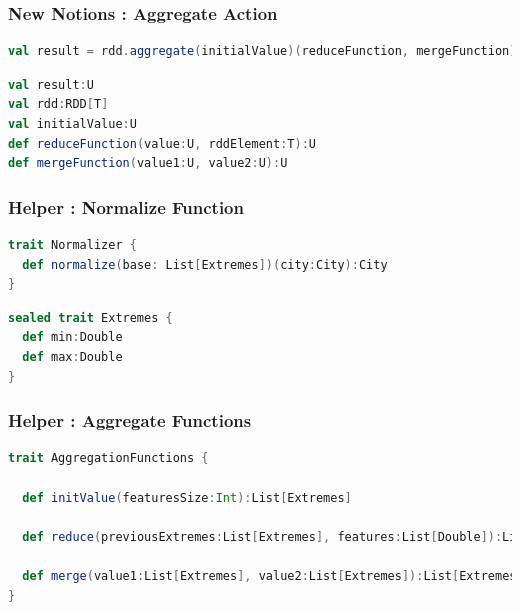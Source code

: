 \documentclass[slidetop,9pt,utf8]{beamer}
\begin{document}
\begin{frame}[fragile]
  \frametitle{New Notions : Aggregate Action}


  \begin{lstlisting}[label=Aggregate, caption=Aggregate over an RDD, language=scala, style=code]
val result = rdd.aggregate(initialValue)(reduceFunction, mergeFunction)
  \end{lstlisting}


  \begin{lstlisting}[label=AggregateType, caption=aggregate's arguments types, language=scala, style=code]
val result:U
val rdd:RDD[T]
val initialValue:U
def reduceFunction(value:U, rddElement:T):U
def mergeFunction(value1:U, value2:U):U
  \end{lstlisting}

\end{frame}

\begin{frame}[fragile]
  \frametitle{Helper : Normalize Function}

\begin{lstlisting}[label=NormalizerTrait, caption=Normalizer Trait, language=scala, style=code]
trait Normalizer {
  def normalize(base: List[Extremes])(city:City):City
}
  \end{lstlisting}

  \begin{lstlisting}[label=ExtremesTrait, caption=Extremes Trait, language=scala, style=code]
sealed trait Extremes {
  def min:Double
  def max:Double
}
  \end{lstlisting}

\end{frame}

\begin{frame}[fragile]
  \frametitle{Helper : Aggregate Functions}

\begin{lstlisting}[label=AggregateFunctionsTrait, caption=Aggregate Functions Trait, language=scala, style=code]
trait AggregationFunctions {

  def initValue(featuresSize:Int):List[Extremes]

  def reduce(previousExtremes:List[Extremes], features:List[Double]):List[Extremes]

  def merge(value1:List[Extremes], value2:List[Extremes]):List[Extremes]
}
\end{lstlisting}

\end{frame}
\end{document}
